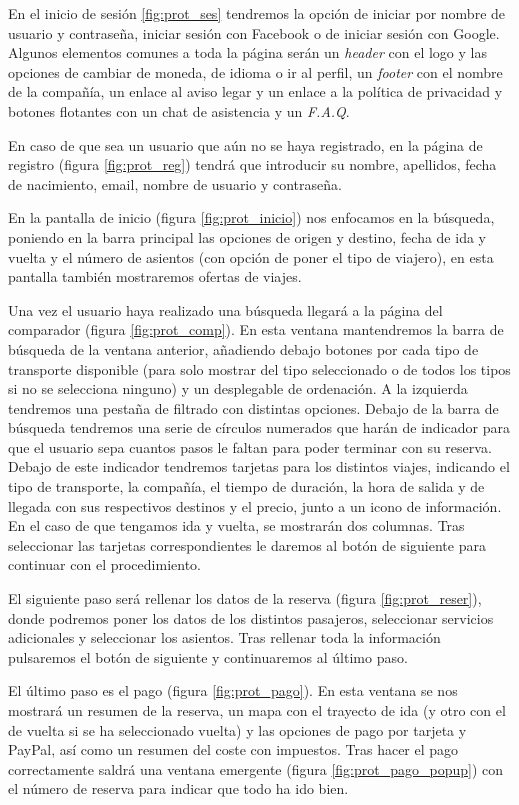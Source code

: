 En el inicio de sesión \ref{fig:prot_ses} tendremos la opción de iniciar por nombre de usuario y contraseña, iniciar sesión con Facebook o de iniciar sesión con Google. Algunos elementos comunes a toda la página serán un \textit{header} con el logo y las opciones de cambiar de moneda, de idioma o ir al perfil, un \textit{footer} con el nombre de la compañía, un enlace al aviso legar y un enlace a la política de privacidad y botones flotantes con un chat de asistencia y un \textit{F.A.Q}.

En caso de que sea un usuario que aún no se haya registrado, en la página de registro (figura \ref{fig:prot_reg}) tendrá que introducir su nombre, apellidos, fecha de nacimiento, email, nombre de usuario y contraseña.

En la pantalla de inicio (figura \ref{fig:prot_inicio}) nos enfocamos en la búsqueda, poniendo en la barra principal las opciones de origen y destino, fecha de ida y vuelta y el número de asientos (con opción de poner el tipo de viajero), en esta pantalla también mostraremos ofertas de viajes. 

Una vez el usuario haya realizado una búsqueda llegará a la página del comparador (figura \ref{fig:prot_comp}). En esta ventana mantendremos la barra de búsqueda de la ventana anterior, añadiendo debajo botones por cada tipo de transporte disponible (para solo mostrar del tipo seleccionado o de todos los tipos si no se selecciona ninguno) y un desplegable de ordenación. A la izquierda tendremos una pestaña de filtrado con distintas opciones. Debajo de la barra de búsqueda tendremos una serie de círculos numerados que harán de indicador para que el usuario sepa cuantos pasos le faltan para poder terminar con su reserva. Debajo de este indicador tendremos tarjetas para los distintos viajes, indicando el tipo de transporte, la compañía, el tiempo de duración, la hora de salida y de llegada con sus respectivos destinos y el precio, junto a un icono de información. En el caso de que tengamos ida y vuelta, se mostrarán dos columnas. Tras seleccionar las tarjetas correspondientes le daremos al botón de siguiente para continuar con el procedimiento.

El siguiente paso será rellenar los datos de la reserva (figura \ref{fig:prot_reser}), donde podremos poner los datos de los distintos pasajeros, seleccionar servicios adicionales y seleccionar los asientos. Tras rellenar toda la información pulsaremos el botón de siguiente y continuaremos al último paso.

El último paso es el pago (figura \ref{fig:prot_pago}). En esta ventana se nos mostrará un resumen de la reserva, un mapa con el trayecto de ida (y otro con el de vuelta si se ha seleccionado vuelta) y las opciones de pago por tarjeta y PayPal, así como un resumen del coste con impuestos. Tras hacer el pago correctamente saldrá una ventana emergente (figura \ref{fig:prot_pago_popup}) con el número de reserva para indicar que todo ha ido bien.

